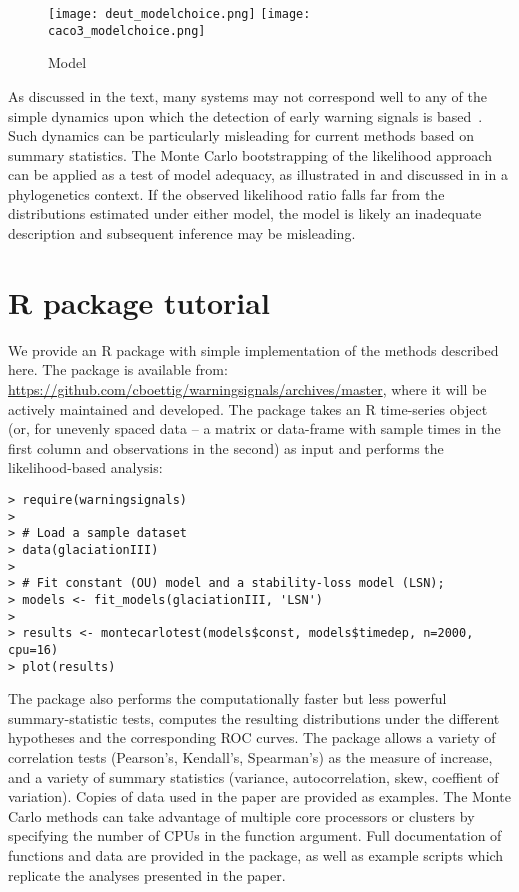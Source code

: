 \documentclass[authoryear, preprint,review,12pt]{elsarticle}
\begin{document}
\begin{figure}[ht]
\begin{center}
\texttt{[image: deut\_modelchoice.png]}
\texttt{[image: caco3\_modelchoice.png]}
\end{center}
\caption{Model }
\label{fig:modelchoice}
\end{figure}

As discussed in the text, many systems may not correspond well to any of the simple dynamics upon which the detection of early warning signals is based~\citep{Hastings2010}.  Such dynamics can be particularly misleading for current methods based on summary statistics.  The Monte Carlo bootstrapping of the likelihood approach can be applied as a test of model adequacy, as illustrated in \citet{Goldman1993} and discussed in \citet{Sullivan2005b} in a phylogenetics context. If the observed likelihood ratio falls far from the distributions estimated under either model, the model is likely an inadequate description and subsequent inference may be misleading.  



\section{R package tutorial}
We provide an R package with simple implementation of the methods described here.  The package is available from: \href{https://github.com/cboettig/warningsignals/archives/master}{https://github.com/cboettig/warningsignals/archives/master}, where it will be actively maintained and developed.  The package takes an R time-series object (or, for unevenly spaced data -- a matrix or data-frame with sample times in the first column and observations in the second) as input and performs the likelihood-based analysis:

\begin{verbatim}
> require(warningsignals)
>
> # Load a sample dataset
> data(glaciationIII)
>
> # Fit constant (OU) model and a stability-loss model (LSN);
> models <- fit_models(glaciationIII, 'LSN')
>
> results <- montecarlotest(models$const, models$timedep, n=2000, cpu=16)
> plot(results)
\end{verbatim}

The package also performs the computationally faster but less powerful summary-statistic tests, computes the resulting distributions under the different hypotheses and the corresponding ROC curves.  The package allows a variety of correlation tests (Pearson's, Kendall's, Spearman's) as the measure of increase, and a variety of summary statistics (variance, autocorrelation, skew, coeffient of variation).  Copies of data used in the paper are provided as examples.  The Monte Carlo methods can take advantage of multiple core processors or clusters by specifying the number of CPUs in the function argument.   Full documentation of functions and data are provided in the package, as well as example scripts which replicate the analyses presented in the paper.   
\end{document}
